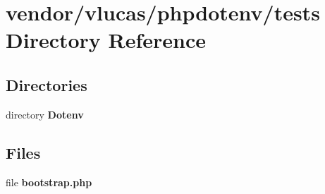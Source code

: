 \section{vendor/vlucas/phpdotenv/tests Directory Reference}
\label{dir_11083793a01813b4f2f0773a431725f6}
\subsection*{Directories}
\begin{DoxyCompactItemize}
\item 
directory {\bf Dotenv}
\end{DoxyCompactItemize}
\subsection*{Files}
\begin{DoxyCompactItemize}
\item 
file {\bf bootstrap.\+php}
\end{DoxyCompactItemize}
